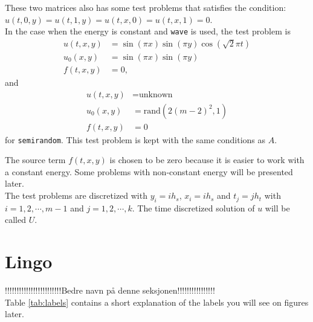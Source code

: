 These two matrices also has some test problems that satisfies the condition: $u(t,0,y) = u(t,1,y) = u(t,x,0) = u(t,x,1) = 0$. \\

In the case when the energy is constant and \texttt{wave} is used, the test problem is 
\begin{equation}
\begin{aligned}
u(t,x,y) &= \sin(\pi x) \sin(\pi y) \cos(\sqrt{2} \pi t) \\
u_0(x,y) &= \sin( \pi x) \sin(\pi y) \\
f(t,x,y) &= 0 ,
\end{aligned}
\end{equation}
and 
\begin{equation}
\begin{aligned}
u(t,x,y) &= \text{unknown} \\
u_0(x,y) &= \text{rand} (2 (m-2)^2,1) \\
f(t,x,y) &= 0
\end{aligned}
\end{equation}
for \texttt{semirandom}. This test problem is kept with the same conditions as $A$.

The source term $f(t,x,y)$ is chosen to be zero because it is easier to work with a constant energy. Some problems with non-constant energy will be presented later.\\

The test problems are discretized with $y_i = i h_s$, $x_i = i h_s$ and $t_j = j h_t$ with $i = 1,2,\cdots,m-1 $ and $ j = 1,2,\cdots,k $. The time discretized solution of $u$ will be called $U$.


\section{Lingo}
!!!!!!!!!!!!!!!!!!!!!!!!Bedre navn på denne seksjonen!!!!!!!!!!!!!!!!\\
Table \ref{tab:labels} contains a short explanation of the labels you will see on figures later. 


